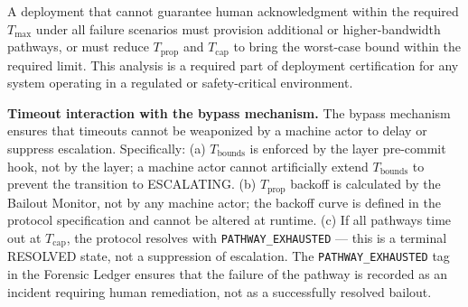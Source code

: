 A deployment that cannot guarantee human acknowledgment within the required $T_{\max}$ under all failure scenarios must provision additional or higher-bandwidth pathways, or must reduce $T_{\text{prop}}$ and $T_{\text{cap}}$ to bring the worst-case bound within the required limit. This analysis is a required part of deployment certification for any \bxthree{} system operating in a regulated or safety-critical environment.

\bigskip
\noindent\textbf{Timeout interaction with the bypass mechanism.} The bypass mechanism ensures that timeouts cannot be weaponized by a machine actor to delay or suppress escalation. Specifically: (a) $T_{\text{bounds}}$ is enforced by the \fact{} layer pre-commit hook, not by the \bounds{} layer; a machine actor cannot artificially extend $T_{\text{bounds}}$ to prevent the transition to ESCALATING. (b) $T_{\text{prop}}$ backoff is calculated by the Bailout Monitor, not by any machine actor; the backoff curve is defined in the protocol specification and cannot be altered at runtime. (c) If all pathways time out at $T_{\text{cap}}$, the protocol resolves with \texttt{PATHWAY\_EXHAUSTED} — this is a terminal RESOLVED state, not a suppression of escalation. The \texttt{PATHWAY\_EXHAUSTED} tag in the Forensic Ledger ensures that the failure of the pathway is recorded as an incident requiring human remediation, not as a successfully resolved bailout.